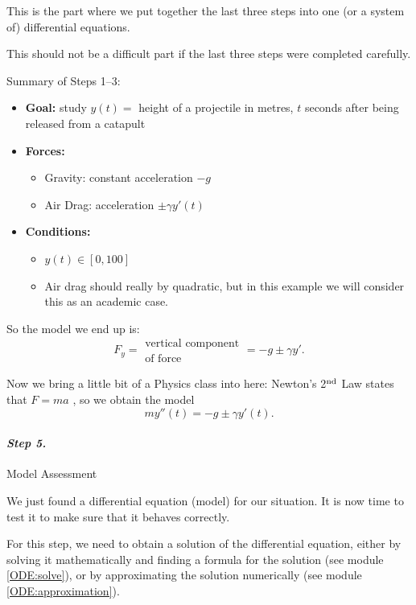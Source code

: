 This is the part where we put together the last three steps into one (or a system of) differential equations.

This should not be a difficult part if the last three steps were completed carefully.

\begin{example}

Summary of Steps 1--3:
\begin{itemize}
	\item \textbf{Goal:} study $y(t) = $ height of a projectile in metres, $t$ seconds after being released from a catapult
	\item \textbf{Forces:}
	\begin{itemize}
		\item Gravity: constant acceleration $-g$
		\item Air Drag: acceleration $\pm \gamma y'(t)$
	\end{itemize}
	\item \textbf{Conditions:}
	\begin{itemize}
		\item $y(t) \in [0,100]$
		\item Air drag should really by quadratic, but in this example we will consider this as an academic case.
	\end{itemize}
\end{itemize}

So the model we end up is:
$$
F_y = \substack{\text{vertical component}\\\text{of force}} = -g \pm \gamma y'.
$$

Now we bring a little bit of a Physics class into here: Newton's 2$^{\rm nd}$ Law states that \quad $F = m a$ \quad, so we obtain the model
$$m y''(t) =  -g \pm \gamma y'(t).$$
\end{example}



\paragraph{\emph{Step 5.}} Model Assessment

We just found a differential equation (model) for our situation. It is now time to test it to make sure that it behaves correctly.

For this step, we need to obtain a solution of the differential equation, either by solving it mathematically and finding a formula for the solution (see module \ref{ODE:solve}), or by approximating the solution numerically (see module \ref{ODE:approximation}).

